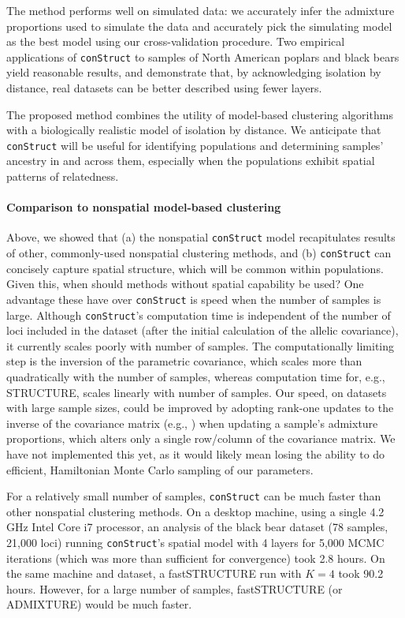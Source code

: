 \documentclass[10pt,letterpaper]{article}
\begin{document}
The method performs well on simulated data:
we accurately infer the admixture proportions used to simulate the data 
and accurately pick the simulating model as the best model using our cross-validation procedure.
Two empirical applications of \texttt{conStruct} to samples of North American poplars and black bears
yield reasonable results,
and demonstrate that,
by acknowledging isolation by distance,
real datasets can be better described using fewer layers.

The proposed method combines the utility of model-based clustering algorithms 
with a biologically realistic model of isolation by distance.
We anticipate that \texttt{conStruct} will be useful for identifying populations 
and determining samples' ancestry in and across them, 
especially when the populations exhibit spatial patterns of relatedness.

\paragraph{Comparison to nonspatial model-based clustering}
Above, we showed that 
(a) the nonspatial \texttt{conStruct} model recapitulates results of 
other, commonly-used nonspatial clustering methods,
and 
(b) \texttt{conStruct} can concisely capture spatial structure, which
will be common within populations.
Given this, when should methods without spatial capability be used?
One advantage these have over \texttt{conStruct} is speed when the number of samples is large.
Although \texttt{conStruct}'s computation time is independent
of the number of loci included in the dataset 
(after the initial calculation of the allelic covariance), 
it currently scales poorly with number of samples.
The computationally limiting step is the inversion of the parametric covariance, 
which scales more than quadratically with the number of samples,
whereas computation time for, e.g., STRUCTURE, 
scales linearly with number of samples.
Our speed, on datasets with large sample sizes, 
could be improved by adopting rank-one updates 
to the inverse of the covariance matrix 
(e.g., \cite{woodbury1950,sherman_morrison1950})
when updating a sample's admixture proportions, 
which alters only a single row/column of the covariance matrix. 
We have not implemented this yet, 
as it would likely mean losing the ability to do efficient,  
Hamiltonian Monte Carlo sampling of our parameters.

For a relatively small number of samples, 
\texttt{conStruct} can be much faster than other nonspatial clustering methods.
On a desktop machine, using a single 4.2 GHz Intel Core i7 processor, 
an analysis of the black bear dataset (78 samples, 21,000 loci) 
running \texttt{conStruct}'s spatial model with 4 layers for 5,000 MCMC iterations 
(which was more than sufficient for convergence) 
took 2.8 hours.
On the same machine and dataset, 
a fastSTRUCTURE run with $K=4$ took 90.2 hours.
However, for a large number of samples, 
fastSTRUCTURE (or ADMIXTURE) would be much faster.
\end{document}
